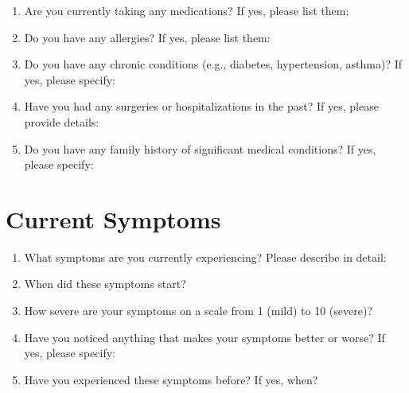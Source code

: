\documentclass{article}
\begin{document}
\begin{enumerate}[leftmargin=*, labelsep=1cm, align=left]
    \item Are you currently taking any medications? If yes, please list them: \\
    \underline{\hspace{25cm}}
    \item Do you have any allergies? If yes, please list them: \\
    \underline{\hspace{25cm}}
    \item Do you have any chronic conditions (e.g., diabetes, hypertension, asthma)? If yes, please specify: \\
    \underline{\hspace{25cm}}
    \item Have you had any surgeries or hospitalizations in the past? If yes, please provide details: \\
    \underline{\hspace{25cm}}
    \item Do you have any family history of significant medical conditions? If yes, please specify: \\
    \underline{\hspace{25cm}}
\end{enumerate}

\section*{Current Symptoms}

\begin{enumerate}[leftmargin=*, labelsep=1cm, align=left]
    \item What symptoms are you currently experiencing? Please describe in detail: \\
    \underline{\hspace{25cm}}
    \item When did these symptoms start? \underline{\hspace{10cm}}
    \item How severe are your symptoms on a scale from 1 (mild) to 10 (severe)? \underline{\hspace{2cm}}
    \item Have you noticed anything that makes your symptoms better or worse? If yes, please specify: \\
    \underline{\hspace{25cm}}
    \item Have you experienced these symptoms before? If yes, when? \\
    \underline{\hspace{25cm}}
\end{enumerate}
\end{document}
